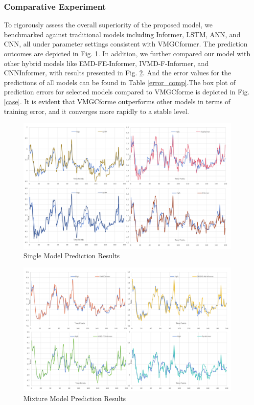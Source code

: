\documentclass[sn-mathphys,Numbered]{sn-jnl}
\theoremstyle{thmstyleone}%
\theoremstyle{thmstyletwo}%
\theoremstyle{thmstylethree}%
\begin{document}
\subsubsection{Comparative Experiment}\label{subsubsec2}

To rigorously assess the overall superiority of the proposed model, we benchmarked against traditional models including Informer, LSTM, ANN, and CNN, all under parameter settings consistent with VMGCformer. The prediction outcomes are depicted in Fig. \ref{comp_single}. In addition, we further compared our model with other hybrid models like EMD-FE-Informer, IVMD-F-Informer, and CNNInformer, with results presented in Fig. \ref{comp_mix}. And the error values for the predictions of all models can be found in Table \ref{error_comp}.The box plot of prediction errors for selected models compared to VMGCforme is depicted in Fig. \ref{case}. It is evident that VMGCforme outperforms other models in terms of training error, and it converges more rapidly to a stable level.

\begin{figure}[h]
    \centering
    \includegraphics[width=1\textwidth]{pngs/comp_single.png}
    \caption{ Single Model Prediction Results}
    \label{comp_single}
\end{figure}

\begin{figure}[h]
    \centering
    \includegraphics[width=1\textwidth]{pngs/comp_mix.png}
    \caption{ Mixture Model Prediction Results}
    \label{comp_mix}
\end{figure}
\end{document}
